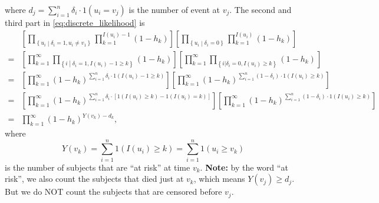 \documentclass[a4paper,12pt]{article}
\begin{document}
where $d_j = \sum\limits_{i = 1}^n\delta_i \cdot 1\left(u_i = v_j\right)$ is the number of event at $v_j$. The second and third part in \eqref{eq:discrete_likelihood} is
\begin{equation}
  \label{eq:discrete_likelihood_part23}
  \begin{aligned}
    & \left[
      \prod\limits_{\left\{u_i\middle|\delta_i = 1, u_i \neq v_1\right\}}
      \prod\limits_{k = 1}^{I\left(u_i\right) - 1}
      \left(1 - h_k\right)
      \right]
      \left[
      \prod\limits_{\left\{u_i\middle|\delta_i = 0\right\}}
      \prod\limits_{k = 1}^{I\left(u_i\right)}\left(1 - h_k\right)
      \right]    \\
    =& \left[
       \prod\limits_{k = 1}^{\infty}
       \prod\limits_{\left\{
       i\middle|\delta_i = 1, I\left(u_i\right) - 1 \geq k
       \right\}}
       \left(1 - h_k\right)
       \right]
       \left[
       \prod\limits_{k = 1}^{\infty}
       \prod\limits_{\left\{i|\delta_i = 0, I\left(u_i\right)\geq k\right\}}
       \left(1 - h_k\right)^{}
       \right]    \\
    =& \left[
       \prod\limits_{k = 1}^{\infty}
       \left(1 - h_k\right)^{\sum\limits_{i = 1}^n \delta_i \cdot 1\left(I\left(u_i\right) - 1 \geq k\right)}
       \right]
       \left[
       \prod\limits_{k = 1}^{\infty}
       \left(1 - h_k\right)^{\sum\limits_{i = 1}^n \left(1 - \delta_i\right) \cdot 1\left(I\left(u_i\right) \geq k\right)}
       \right]    \\
    =& \left[
       \prod\limits_{k = 1}^{\infty}
       \left(1 - h_k\right)^{
       \sum\limits_{i = 1}^n \delta_i \cdot \left[
       1\left(I\left(u_i\right) \geq k\right)
       - 1\left(I\left(u_i\right) = k\right)
       \right]
       }
       \right]
       \left[
       \prod\limits_{k = 1}^{\infty}
       \left(1 - h_k\right)^{\sum\limits_{i = 1}^n \left(1 - \delta_i\right) \cdot 1\left(I\left(u_i\right) \geq k\right)}
       \right]    \\
    =& \prod\limits_{k = 1}^{\infty}
       \left(1 - h_k\right)^{Y\left(v_k\right) - d_k}
       ,
  \end{aligned}
\end{equation}
where
\[
  Y\left(v_k\right) = \sum\limits_{i = 1}^n1\left(I\left(u_i\right)\geq k\right)
  = \sum\limits_{i = 1}^n1\left(u_i \geq v_k\right)
\]
is the number of subjects that are ``at risk'' at time $v_k$. \textbf{Note: }by the word ``at risk'', we also count the subjects that died just at $v_k$, which means $Y\left(v_j\right) \geq d_j$. But we do NOT count the subjects that are censored before $v_j$.
\end{document}
